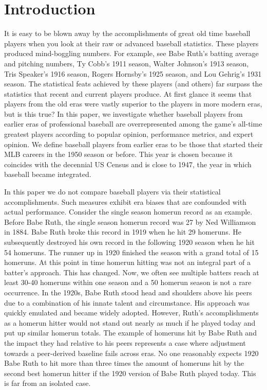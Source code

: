 \documentclass[11pt]{article}\usepackage[]{graphicx}\usepackage[]{color}
\begin{document}
\section{Introduction}
\doublespacing
It is easy to be blown away by the accomplishments of great old time 
baseball players when you look at their raw or advanced baseball statistics.  
These players produced mind-boggling numbers. For example, see 
Babe Ruth's batting average and pitching numbers, 
Ty Cobb's 1911 season, 
Walter Johnson's 1913 season, 
Tris Speaker's 1916 season, 
Rogers Hornsby's 1925 season, 
and
Lou Gehrig's 1931 season.
The statistical feats achieved by these players (and others) far surpass 
the statistics that recent and current players produce.  At first glance 
it seems that players from the old eras were vastly superior to the 
players in more modern eras, but is this true? 
In this paper, we investigate whether baseball players from earlier 
eras of professional baseball are overrepresented among the game's all-time 
greatest players according to popular opinion, performance metrics, and expert 
opinion.  We define baseball players from earlier eras to be those that 
started their MLB careers in the 1950 season or before.  
This year is chosen because it coincides with the decennial US Census 
and is close to 1947, the year in which baseball became integrated. 

In this paper we do not compare baseball players via their statistical 
accomplishments.  Such measures exhibit era biases that are confounded with 
actual performance.  Consider the single season homerun record as an example. 
Before Babe Ruth, the single season homerun record was 27 by Ned Williamson in 
1884. %
Babe Ruth broke this record in 1919 
when he hit 29 homeruns.  He subsequently destroyed his own record in 
the following 1920 season when he hit 54 homeruns.  The runner up in 1920 
finished the season with a grand total of 15 homeruns.  At this point in time 
homerun hitting was not an integral part of a batter's approach. %
This has changed. Now, we often see multiple batters reach at least 30-40 
homeruns within one season and a 50 homerun season is not a rare 
occurrence. %
In the 1920s, Babe Ruth stood head and shoulders above his peers due to a 
combination of his innate talent and circumstance.  
His approach was quickly emulated and became widely adopted. %
However, Ruth's accomplishments as a homerun hitter would not stand out nearly 
as much if he played today and put up similar homerun totals.    
The example of homeruns hit by Babe Ruth and the impact they had relative 
to his peers represents a case where adjustment towards a peer-derived 
baseline fails across eras.  No one reasonably expects 1920 Babe Ruth to hit 
more than three times the amount of homeruns hit by the second best homerun 
hitter if the 1920 version of Babe Ruth played today.  
This is far from an isolated case.  
\end{document}
